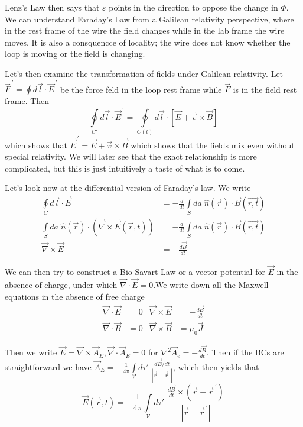 \documentclass[10pt]{report}
\newcommand{\rd}[2]{\frac{d#1}{d#2}}
\newcommand{\pvec}[1]{\vec{#1}^{\,\prime}}
\newcommand{\abs}[1]{\left|#1\right|}
\begin{document}
Lenz's Law then says that $\varepsilon$ points in the direction to oppose the change in $\Phi$. We can understand Faraday's Law from a Galilean relativity perspective, where in the rest frame of the wire the field changes while in the lab frame the wire moves. It is also a consquencce of locality; the wire does not know whether the loop is moving or the field is changing.

Let's then examine the transformation of fields under Galilean relativity. Let $\pvec{F} = \oint d\vec{l} \cdot \pvec{E}$ be the force feld in the loop rest frame while $\vec{F}$ is in the field rest frame. Then
\begin{equation}
    \oint\limits_{C'} d\vec{l} \cdot \pvec{E} = \oint\limits_{C(t)} d\vec{l} \cdot \left[ \vec{E} + \vec{v} \times \vec{B} \right]
\end{equation}
which shows that $\pvec{E} = \vec{E} + \vec{v} \times \vec{B}$ which shows that the fields mix even without special relativity. We will later see that the exact relationship is more complicated, but this is just intuitively a taste of what is to come.

Let's look now at the differential version of Faraday's law. We write
\begin{align}
    \oint\limits_C d\vec{l} \cdot \vec{E} &= -\rd{}{t} \int\limits_{S}^{}da\; \hat{n}(\vec{r}) \cdot \vec{B}(\vec{r, t})\\
    \int\limits_S da \;\hat{n}(\vec{r}) \cdot (\vec{\nabla} \times \vec{E}(\vec{r},t)) &= -\rd{}{t} \int\limits_{S}^{}da\; \hat{n}(\vec{r}) \cdot \vec{B}(\vec{r, t})\\
    \vec{\nabla} \times \vec{E} &= -\rd{\vec{B}}{t}
\end{align}

We can then try to construct a Bio-Savart Law or a vector potential for $\vec{E}$ in the absence of charge, under which $\vec{\nabla} \cdot \vec{E} = 0$.We write down all the Maxwell equations in the absence of free charge
\begin{align}
    \vec{\nabla} \cdot \vec{E} &= 0 & \vec{\nabla} \times \vec{E} &= -\rd{\vec{B}}{t}\\
    \vec{\nabla} \cdot \vec{B} &= 0 & \vec{\nabla} \times \vec{B} &= \mu_0 \vec{J}
\end{align}

Then we write $\vec{E} = \vec{\nabla} \times \vec{A}_E, \vec{\nabla} \cdot \vec{A}_E = 0$ for $\nabla^2\vec{A}_e = -\rd{\vec{B}}{t}$. Then if the BCs are straightforward we have $\vec{A}_E = -\frac{1}{4\pi}\int\limits_{\mathcal{V}}^{}d\tau'\;\frac{d\vec{B}/dt}{\abs{\vec{r} - \pvec{r}}}$, which then yields that
\begin{equation}
    \vec{E}(\vec{r},t) = -\frac{1}{4\pi}\int\limits_{\mathcal{V}}^{}d\tau'\;\frac{\rd{\vec{B}}{t}\times\left( \vec{r} - \pvec{r} \right)}{\abs{\vec{r} - \pvec{r}}} \label{4.22.useful}
\end{equation}
\end{document}
